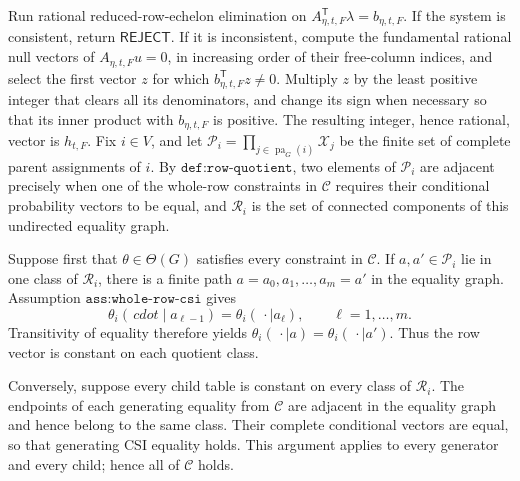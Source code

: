 Run rational reduced-row-echelon elimination on \(A_{\eta,t,F}^{\mathsf T}\lambda=b_{\eta,t,F}\). If the system is consistent, return \(\mathsf{REJECT}\). If it is inconsistent, compute the fundamental rational null vectors of \(A_{\eta,t,F}u=0\), in increasing order of their free-column indices, and select the first vector \(z\) for which \(b_{\eta,t,F}^{\mathsf T}z\ne0\). Multiply \(z\) by the least positive integer that clears all its denominators, and change its sign when necessary so that its inner product with \(b_{\eta,t,F}\) is positive. The resulting integer, hence rational, vector is \(h_{t,F}\).
Fix \(i\in V\), and let \(\mathcal P_i=\prod_{j\in\operatorname{pa}_G(i)}\mathcal X_j\) be the finite set of complete parent assignments of \(i\). By \(\texttt{def:row-quotient}\), two elements of \(\mathcal P_i\) are adjacent precisely when one of the whole-row constraints in \(\mathcal C\) requires their conditional probability vectors to be equal, and \(\mathcal R_i\) is the set of connected components of this undirected equality graph.

Suppose first that \(\theta\in\Theta(G)\) satisfies every constraint in \(\mathcal C\). If \(a,a'\in\mathcal P_i\) lie in one class of \(\mathcal R_i\), there is a finite path \(a=a_0,a_1,\ldots,a_m=a'\) in the equality graph. Assumption \(\texttt{ass:whole-row-csi}\) gives
\[
 \theta_i(\,cdot\mid a_{\ell-1})=\theta_i(\,\cdot\mid a_\ell),
 \qquad \ell=1,\ldots,m.
\]
Transitivity of equality therefore yields \(\theta_i(\,\cdot\mid a)=\theta_i(\,\cdot\mid a')\). Thus the row vector is constant on each quotient class.

Conversely, suppose every child table is constant on every class of \(\mathcal R_i\). The endpoints of each generating equality from \(\mathcal C\) are adjacent in the equality graph and hence belong to the same class. Their complete conditional vectors are equal, so that generating CSI equality holds. This argument applies to every generator and every child; hence all of \(\mathcal C\) holds.

